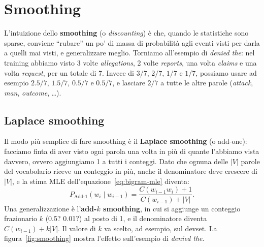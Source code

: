 \section{Smoothing}
L'intuizione dello \textbf{smoothing} (o \textit{discounting}) è che, quando le statistiche sono sparse, conviene \enquote{rubare} un po' di massa di probabilità agli eventi visti per darla a quelli mai visti, e generalizzare meglio. Torniamo all'esempio di \textit{denied the}: nel training abbiamo visto 3 volte \textit{allegations}, 2 volte \textit{reports}, una volta \textit{claims} e una volta \textit{request}, per un totale di 7. Invece di $3/7$, $2/7$, $1/7$ e $1/7$, possiamo usare ad esempio $2.5/7$, $1.5/7$, $0.5/7$ e $0.5/7$, e lasciare $2/7$ a tutte le altre parole (\textit{attack}, \textit{man}, \textit{outcome}, \dots).

\subsection{Laplace smoothing}
Il modo più semplice di fare smoothing è il \textbf{Laplace smoothing} (o add-one): facciamo finta di aver visto ogni parola una volta in più di quante l'abbiamo vista davvero, ovvero aggiungiamo 1 a tutti i conteggi. Dato che ognuna delle $|V|$ parole del vocabolario riceve un conteggio in più, anche il denominatore deve crescere di $|V|$, e la stima MLE dell'equazione~\eqref{eq:bigram-mle} diventa:
\begin{equation}\label{eq:laplace}
P_{\text{Add-1}}(w_i \mid w_{i-1}) = \frac{C(w_{i-1} w_i) + 1}{C(w_{i-1}) + |V|}.
\end{equation}
Una generalizzazione è l'\textbf{add-$k$ smoothing}, in cui si aggiunge un conteggio frazionario $k$ (0.5? 0.01?) al posto di 1, e il denominatore diventa $C(w_{i-1}) + k|V|$. Il valore di $k$ va scelto, ad esempio, sul devset. La figura~\ref{fig:smoothing} mostra l'effetto sull'esempio di \textit{denied the}.

